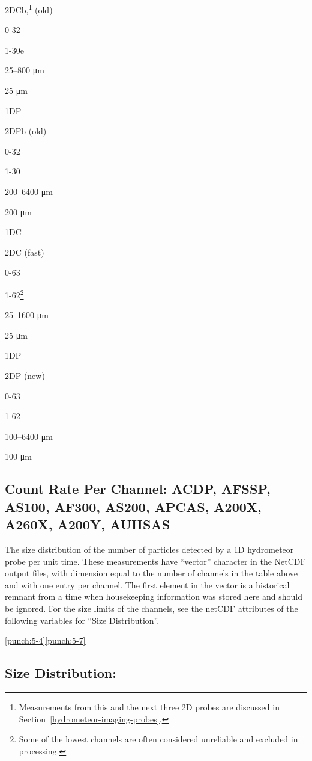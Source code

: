 \documentclass[
  english,
]{book}
\begin{document}
2DC{b,}\footnote{Measurements from this and the next three 2D probes are discussed in Section~\ref{hydrometeor-imaging-probes}.}
(old)

0-32

1-30{e}

25--800 {μ}m

25 {μ}m

1DP

2DP{b} (old)

0-32

1-30

200--6400 {μ}m

200 {μ}m

1DC

2DC (fast)

0-63

1-62\footnote{Some of the lowest channels are often considered unreliable and excluded in processing.}

25--1600 {μ}m

25 {μ}m

1DP

2DP (new)

0-63

1-62

100--6400 {μ}m

100 {μ}m

\hypertarget{CRPC}{%
\subsection*{Count Rate Per Channel: ACDP, AFSSP, AS100, AF300, AS200, APCAS, A200X, A260X, A200Y, AUHSAS}\label{CRPC}}

The size distribution of the number of particles detected by a 1D hydrometeor probe per unit time. These measurements have ``vector'' character in the NetCDF output files, with dimension equal to the number of channels in the table above and with one entry per channel. The first element in the vector is a historical remnant from a time when housekeeping information was stored here and should be ignored. For the size limits of the channels, see the netCDF attributes of the following variables for ``Size Distribution''.

\underline{\protect\hypertarget{punch:5-4}{}{{[}punch:5-4{]}}\protect\hypertarget{punch:5-7}{}{{[}punch:5-7{]}}}

\hypertarget{size-distribution}{%
\subsection*{Size Distribution:}\label{size-distribution}}
\end{document}
